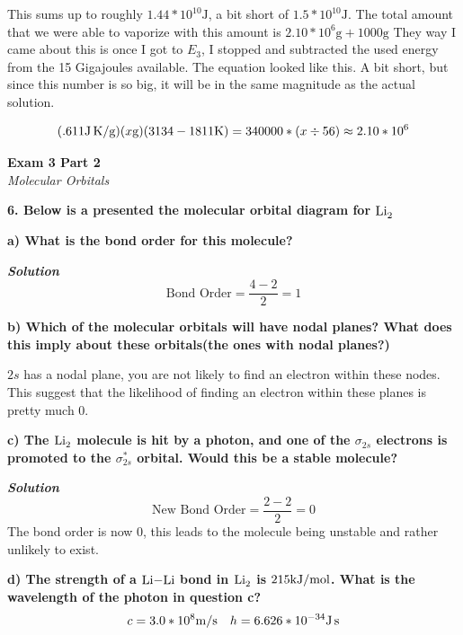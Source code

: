 \documentclass{article}
\begin{document}
    This sums up to roughly $1.44 * 10^{10} \si{\joule}$, a bit short of $1.5 * 10^{10} \si{\joule}$. The total amount that we were able to vaporize with this amount is $2.10 * 10^{6} \si{\gram} + 1000 \si{\gram} $
    They way I came about this is once I got to $E_{3}$, I stopped and subtracted the used energy from the 15 Gigajoules available. The equation looked like this. A bit short, but since this number is so big, it will be in the same magnitude as the actual solution.

    $$(.611 \si[per-mode=symbol]{\joule\per\gram\kelvin})( x \si{\gram})(3134 - 1811 \si{\kelvin})  =  340000 *(x \div 56) \approx 2.10*10^{6}$$


    \pagebreak

    \begin{center}
        \textbf{Exam 3 Part 2}\\
        \textit{Molecular Orbitals}
    \end{center}
    \textbf{6. Below is a presented the molecular orbital diagram for $\ce{Li2}$}

    \textbf{a) What is the bond order for this molecule?}

    \textbf{\textit{Solution}}
    $$\text{Bond Order} = \dfrac{4 - 2}{2} = 1$$

    \textbf{b) Which of the molecular orbitals will have nodal planes? What does this imply about these orbitals(the ones with nodal planes?)}

    $2s$ has a nodal plane, you are not likely to find an electron within these nodes. This suggest that the likelihood of finding an electron within these planes is pretty much 0.

    \textbf{c) The $\ce{Li2}$ molecule is hit by a photon, and one of the $\sigma_{2s}$ electrons is promoted to the $\sigma_{2s}^{*}$ orbital. Would this be a stable molecule? }

    \textbf{\textit{Solution}}
    $$\text{New Bond Order} = \dfrac{2 - 2}{2} = 0$$
    The bond order is now 0, this leads to the molecule being unstable and rather unlikely to exist.

    \textbf{d) The strength of a $\ce{Li-Li}$ bond in $\ce{Li2}$ is $215 \si[per-mode=symbol]{\kilo\joule\per\mole}$. What is the wavelength of the photon in question c?}
    $$ c = 3.0 * 10^{8} \si[per-mode=symbol]{\meter\per\second} \quad h = 6.626 * 10^{-34} \si{\joule\second}$$
\end{document}
